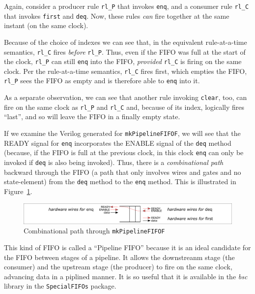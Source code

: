 Again, consider a producer rule \verb|rl_P| that invokes \verb|enq|,
and a consumer rule \verb|rl_C| that invokes \verb|first| and
\verb|deq|.  Now, these rules \emph{can} fire together at the same
instant (on the same clock).

Because of the choice of indexes we can see that, in the equivalent
rule-at-a-time semantics, \verb|rl_C| fires \emph{before} \verb|rl_P|.
Thus, even if the FIFO was full at the start of the clock, \verb|rl_P|
can still \verb|enq| into the FIFO, \emph{provided} \verb|rl_C| is
firing on the same clock.  Per the rule-at-a-time semantics,
\verb|rl_C| fires first, which empties the FIFO, {\ie} \verb|rl_P|
sees the FIFO as empty and is therefore able to \verb|enq| into it.

As a separate observation, we can see that another rule invoking
\verb|clear|, too, can fire on the same clock as \verb|rl_P| and
\verb|rl_C| and, because of its index, logically fires ``last'', and
so will leave the FIFO in a finally empty state.

If we examine the Verilog generated for \verb|mkPipelineFIFOF|, we
will see that the READY signal for \verb|enq| incorporates the ENABLE
signal of the \verb|deq| method (because, if the FIFO is full at the
previous clock, in this clock \verb|enq| can only be invoked if
\verb|deq| is also being invoked).  Thus, there is a
\emph{combinational path} backward through the FIFO (a path that only
involves wires and gates and no state-element) from the \verb|deq|
method to the \verb|enq| method.  This is illustrated in
Figure~\ref{Fig_Combo_path_in_mkPipelineFIFOF}.
\begin{figure}[htbp]
  \centerline{\includegraphics[width=6in,angle=0]{Figures/Fig_Combo_path_in_mkPipelineFIFOF}}
  \caption{\label{Fig_Combo_path_in_mkPipelineFIFOF}
           Combinational path through {\tt mkPipelineFIFOF}}
\end{figure}

This kind of FIFO is called a ``Pipeline FIFO'' because it is an ideal
candidate for the FIFO between stages of a pipeline.  It allows the
downstreanm stage (the consumer) and the upstream stage (the producer)
to fire on the same clock, advancing data in a piplined manner.  It is
so useful that it is available in the \emph{bsc} library in the
\verb|SpecialFIFOs| package.

